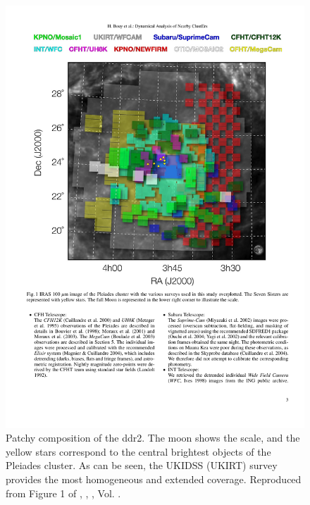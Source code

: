 \begin{figure}[ht!]
\begin{center}
\includegraphics[width=\textwidth]{background/Figures/F1_Bouy2013.pdf}
\caption{Patchy composition of the \gls{ddr2}. The moon shows the scale, and the yellow stars correspond to the central brightest objects of the Pleiades cluster. As can be seen, the UKIDSS (UKIRT) survey provides the most homogeneous and extended coverage. Reproduced from Figure 1 of \citet{Bouy2013}, \textit{}, , Vol. .}
\label{fig:originDANCeDR2}
\end{center}
\end{figure}

